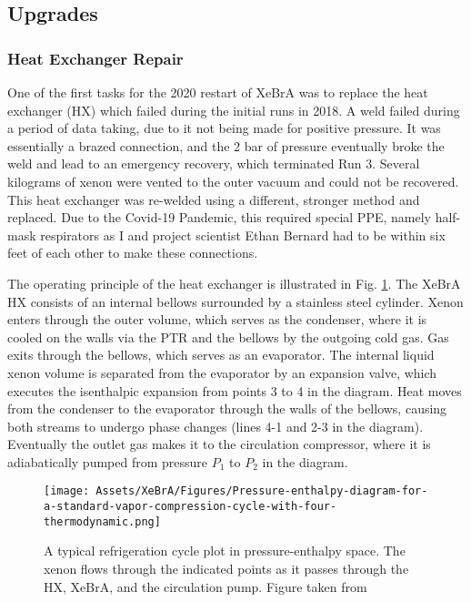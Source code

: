 \subsection{Upgrades}
\subsubsection{Heat Exchanger Repair}
One of the first tasks for the 2020 restart of XeBrA was to replace the heat exchanger (HX) which failed during the initial runs in 2018.
A weld failed during a period of data taking, due to it not being made for positive pressure.
It was essentially a brazed connection, and the 2 bar of pressure eventually broke the weld and lead to an emergency recovery, which terminated Run 3.
Several kilograms of xenon were vented to the outer vacuum and could not be recovered.
This heat exchanger was re-welded using a different, stronger method and replaced.
Due to the Covid-19 Pandemic, this required special PPE, namely half-mask respirators as I and project scientist Ethan Bernard had to be within six feet of each other to make these connections.

The operating principle of the heat exchanger is illustrated in Fig. \ref{fig:fridge_cycle}.
The XeBrA HX consists of an internal bellows surrounded by a stainless steel cylinder.
Xenon enters through the outer volume, which serves as the condenser, where it is cooled on the walls via the PTR and the bellows by the outgoing cold gas.
Gas exits through the bellows, which serves as an evaporator.
The internal liquid xenon volume is separated from the evaporator by an expansion valve, which executes the isenthalpic expansion from points 3 to 4 in the diagram.
Heat moves from the condenser to the evaporator through the walls of the bellows, causing both streams to undergo phase changes (lines 4-1 and 2-3 in the diagram).
Eventually the outlet gas makes it to the circulation compressor, where it is adiabatically pumped from pressure $P_1$ to $P_2$ in the diagram.

\begin{figure} 
    \centering
    \texttt{[image: Assets/XeBrA/Figures/Pressure-enthalpy-diagram-for-a-standard-vapor-compression-cycle-with-four-thermodynamic.png]}
    \caption[A typical refrigeration cycle plot in pressure-enthalpy space.]%
    {A typical refrigeration cycle plot in pressure-enthalpy space.
    The xenon flows through the indicated points as it passes through the HX, XeBrA, and the circulation pump.
    Figure taken from \cite{jain_thermodynamics-based_2011}}
    \label{fig:fridge_cycle}
\end{figure}

